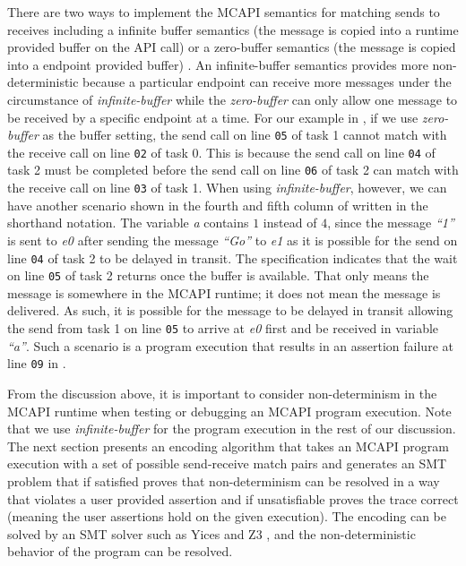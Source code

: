 There are two ways to implement the MCAPI semantics for matching sends to receives including a infinite buffer semantics (the message is copied into a runtime provided buffer on the API call) or a zero-buffer semantics (the message is copied into a endpoint provided buffer) \cite{sarvani:fm09}.  An infinite-buffer semantics provides more non-deterministic because a particular endpoint can receive more messages under the circumstance of \textit{infinite-buffer} while the \textit{zero-buffer} can only allow one message to be received by a specific endpoint at a time. For our example in , if we use \textit{zero-buffer} as the buffer setting, the send call on line \texttt{05} of task 1 cannot match with the receive call on line \texttt{02} of task 0. This is because the send call on line \texttt{04} of task 2 must be completed before the send call on line \texttt{06} of task 2 can match with the receive call on line \texttt{03} of task 1. When using \textit{infinite-buffer}, however, we can have another scenario shown in the fourth and fifth column of  written in the shorthand notation. The variable \textit{a} contains $1$ instead of $4$, since the message \textit{``1''} is sent to \textit{e0} after sending the message \textit{``Go''} to \textit{e1} as it is possible for the send on line \texttt{04} of task 2 to be delayed in transit. The specification indicates that the wait on line \texttt{05} of task 2 returns once the buffer is available. That only means the message is somewhere in the MCAPI runtime; it does not mean the message is delivered. As such, it is possible for the message to be delayed in transit allowing the send from task 1 on line \texttt{05} to arrive at \textit{e0} first and be received in variable \textit{``a''}. Such a scenario is a program execution that results in an assertion failure at line \texttt{09} in .

From the discussion above, it is important to consider non-determinism in the MCAPI runtime when testing or debugging an MCAPI program execution. Note that we use \textit{infinite-buffer} for the program execution in the rest of our discussion. The next section presents an encoding algorithm that takes an MCAPI program execution with a set of possible send-receive match pairs and generates an SMT problem that if satisfied proves that non-determinism can be resolved in a way that violates a user provided assertion and if unsatisfiable proves the trace correct (meaning the user assertions hold on the given execution). The encoding can be solved by an SMT solver such as Yices \cite{dutertre:CAV06} and Z3 \cite{demoura:tacas08}, and the non-deterministic behavior of the program can be resolved.

